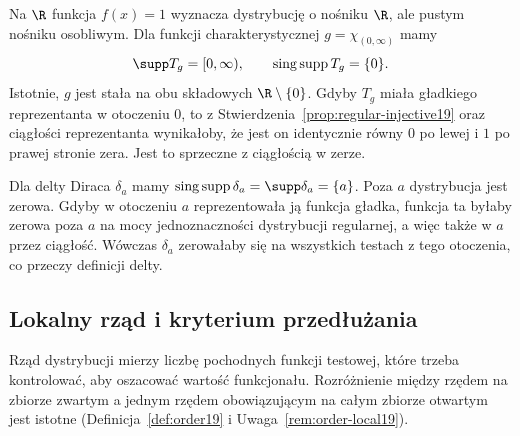 \begin{przyklad}
\label{ex:dt-singular-support}
Na $\R$ funkcja $f(x)=1$ wyznacza dystrybucję
o nośniku $\R$, ale pustym nośniku osobliwym.
Dla funkcji charakterystycznej $g=\chi_{(0,\infty)}$
mamy
\[
 \supp T_g=[0,\infty),\qquad
 \operatorname{sing\,supp}T_g=\{0\}.
\]
Istotnie, $g$ jest stała na obu składowych
$\R\setminus\{0\}$. Gdyby $T_g$ miała gładkiego
reprezentanta w otoczeniu $0$, to z
Stwierdzenia~\ref{prop:regular-injective19}
oraz ciągłości reprezentanta wynikałoby, że jest on
identycznie równy $0$ po lewej i $1$ po prawej stronie
zera. Jest to sprzeczne z ciągłością w zerze.

Dla delty Diraca $\delta_a$ mamy
$\operatorname{sing\,supp}\delta_a=\supp\delta_a=\{a\}$.
Poza $a$ dystrybucja jest zerowa. Gdyby w otoczeniu $a$
reprezentowała ją funkcja gładka, funkcja ta byłaby
zerowa poza $a$ na mocy jednoznaczności dystrybucji
regularnej, a więc także w $a$ przez ciągłość.
Wówczas $\delta_a$ zerowałaby się na wszystkich testach
z tego otoczenia, co przeczy definicji delty.
\end{przyklad}


\subsection{Lokalny rząd i kryterium przedłużania}

Rząd dystrybucji mierzy liczbę pochodnych funkcji testowej,
które trzeba kontrolować, aby oszacować wartość funkcjonału.
Rozróżnienie między rzędem na zbiorze zwartym a jednym
rzędem obowiązującym na całym zbiorze otwartym jest istotne
(Definicja~\ref{def:order19} i Uwaga~\ref{rem:order-local19}).

